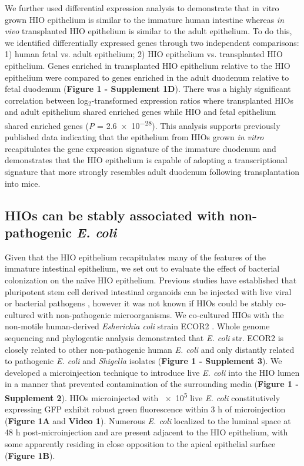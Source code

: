 \documentclass[9pt,lineo]{elife}
\begin{document}
We further used differential expression analysis to demonstrate that in vitro grown HIO epithelium is similar to the immature human intestine whereas \emph{in vivo} transplanted HIO epithelium is similar to the adult epithelium.  To do this, we identified differentially expressed genes through two independent comparisons: 1) human fetal vs. adult epithelium; 2) HIO epithelium vs. transplanted HIO epithelium. Genes enriched in transplanted HIO epithelium relative to the HIO epithelium were compared to genes enriched in the adult duodenum relative to fetal duodenum (\textbf{Figure 1 - Supplement 1D}). There was a highly significant correlation between log\(_{\text{2}}\)-transformed expression ratios where transplanted HIOs and adult epithelium shared enriched genes while HIO and fetal epithelium shared enriched genes  (\emph{P} = \num{2.6e-28}). This analysis supports previously published data indicating that the epithelium from HIOs grown \emph{in vitro} recapitulates the gene expression signature of the immature duodenum and demonstrates that the HIO epithelium is capable of adopting a transcriptional signature that more strongly resembles adult duodenum following transplantation into mice.

\subsection*{{\bfseries\sffamily } HIOs can be stably associated with non-pathogenic \emph{E. coli}}
\label{sec:orgheadline3}
Given that the HIO epithelium recapitulates many of the features of the immature intestinal epithelium, we set out to evaluate the effect of bacterial colonization on the na{\"i}ve HIO epithelium. Previous studies have established that pluripotent stem cell derived intestinal organoids can be injected with live viral \citep{Finkbeiner:2012} or bacterial pathogens \citep{Leslie:2015,Engevik:2015,Forbester:2015}, however it was not known if HIOs could be stably co-cultured with non-pathogenic microorganisms. We co-cultured HIOs with the non-motile human-derived \emph{Esherichia coli} strain ECOR2 \citep{Ochman:1984}. Whole genome sequencing and phylogentic analysis demonstrated that \emph{E. coli} str. ECOR2 is closely related to other non-pathogenic human \emph{E. coli} and only distantly related to pathogenic \emph{E. coli} and \emph{Shigella} isolates (\textbf{Figure 1 - Supplement 3}). We developed a microinjection technique to introduce live \emph{E. coli} into the HIO lumen in a manner that prevented contamination of the surrounding media (\textbf{Figure 1 - Supplement 2}). HIOs microinjected with \num{e5} live \emph{E. coli} constitutively expressing GFP exhibit robust green fluorescence within 3 h of microinjection (\textbf{Figure 1A} and \textbf{Video 1}). Numerous \emph{E. coli} localized to the luminal space at 48 h post-microinjection and are present adjacent to the HIO epithelium, with some apparently residing in close opposition to the apical epithelial surface (\textbf{Figure 1B}).
\end{document}
